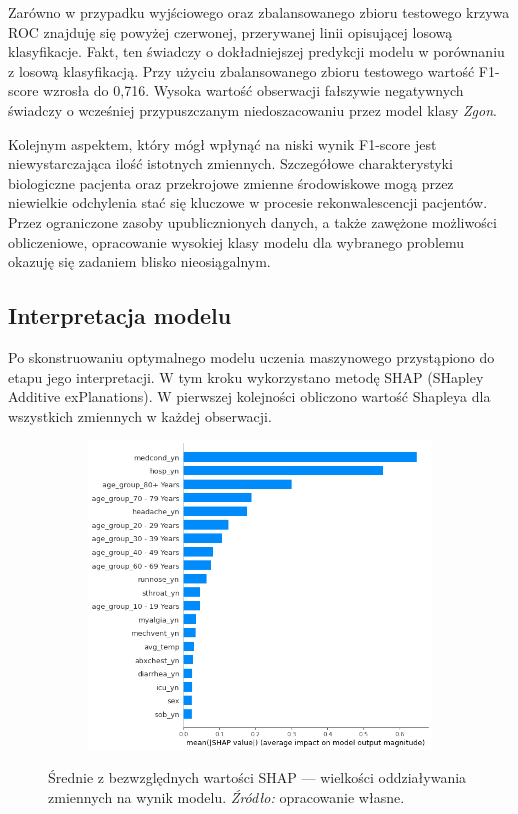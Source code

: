 \documentclass[polish, twoside, 12pt, a4paper]{article}
\theoremstyle{definition}
\theoremstyle{plain}
\theoremstyle{remark}
\begin{document}
Zarówno w przypadku wyjściowego oraz zbalansowanego zbioru testowego krzywa ROC znajduję się powyżej czerwonej, przerywanej linii opisującej losową klasyfikacje. Fakt, ten świadczy o dokładniejszej predykcji modelu w porównaniu z losową klasyfikacją. Przy użyciu zbalansowanego zbioru testowego wartość F1-score wzrosła do 0,716. Wysoka wartość obserwacji fałszywie negatywnych świadczy o wcześniej przypuszczanym niedoszacowaniu przez model klasy \emph{Zgon}.

Kolejnym aspektem, który mógł wpłynąć na niski wynik F1-score jest niewystarczająca ilość istotnych zmiennych. Szczegółowe charakterystyki biologiczne pacjenta oraz przekrojowe zmienne środowiskowe mogą przez niewielkie odchylenia stać się kluczowe w procesie rekonwalescencji pacjentów. Przez ograniczone zasoby upublicznionych danych, a także zawężone możliwości obliczeniowe, opracowanie wysokiej klasy modelu dla wybranego problemu okazuję się zadaniem blisko nieosiągalnym.

\subsection{Interpretacja modelu}

Po skonstruowaniu optymalnego modelu uczenia maszynowego przystąpiono do etapu jego interpretacji. W tym kroku wykorzystano metodę SHAP (SHapley Additive exPlanations). W pierwszej kolejności obliczono wartość Shapleya dla wszystkich zmiennych w każdej obserwacji. 

\begin{figure}[H]
  \centering
  \begin{subfigure}[t]{\textwidth}
	\centering
    \includegraphics[width=10cm]{shap_abs.png}
  \end{subfigure}
  \captionsetup{margin=10pt,font=small,labelfont=bf,width=.8\textwidth}
  \caption{Średnie z bezwzględnych wartości SHAP  --- wielkości oddziaływania zmiennych na wynik modelu. \textit{Źródło:} opracowanie własne.}
\end{figure}
\end{document}
